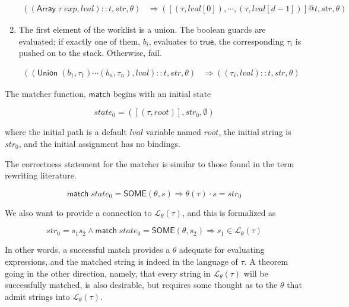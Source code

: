 \documentclass[svgnames]{llncs}
\newcommand{\konst}[1]{\ensuremath{\mathsf{#1}}}
\newcommand{\imp}{\Rightarrow}
\newcommand{\lval}{\ensuremath{\mathit{lval}}}
\newcommand{\LangTheta}[1]{\ensuremath{{\mathcal L}_{\theta}({#1})}}
\begin{document}
\begin{definition}
\begin{enumerate}
\begin{align*}
((\konst{Array}\; \tau \; \mathit{exp},\lval)::t, \mathit{str}, \theta)
   &\Rightarrow
  ([(\tau,\lval[0]), \cdots , (\tau,\lval[d-1])] @ t,\mathit{str}, \theta)
\end{align*}

\item The first element of the worklist is a union. The boolean guards
  are evaluated; if exactly one of them, $b_i$, evaluates to \konst{true}, the
  corresponding $\tau_i$ is pushed on to the stack. Otherwise, fail.

\begin{align*}
((\konst{Union}\; (b_1,\tau_1) \cdots (b_n,\tau_n), \lval)::t, \mathit{str}, \theta)
   &\Rightarrow
  ((\tau_i,\lval)::t,\mathit{str}, \theta)
\end{align*}


\end{enumerate}

\noindent The matcher function, \konst{match} begins with an initial state

\[
  \mathit{state}_0 = ([(\tau,\mathit{root})],\mathit{str}_0,\emptyset)
\]

where the initial path is a default \lval{} variable named
$\mathit{root}$, the initial string is $\mathit{str}_0$, and the
initial assignment has no bindings.

\end{definition}

The correctness statement for the matcher is similar to those found in
the term rewriting literature.

\begin{theorem}

\[
  \konst{match}\; \mathit{state}_0 = \konst{SOME}(\theta, s)
  \imp \theta(\tau) \cdot s = \mathit{str}_0
\]

\noindent We also want to provide a connection to $\LangTheta{\tau}$,
and this is formalized as

\[
  \mathit{str}_0 = s_1 s_2 \land \konst{match}\; \mathit{state}_0 =
  \konst{SOME}(\theta, s_2) \imp s_1 \in \LangTheta{\tau}
\]

In other words, a successful match provides a $\theta$ adequate for
evaluating expressions, and the matched string is indeed in the
language of $\tau$. A theorem going in the other direction, namely,
that every string in $\LangTheta{\tau}$ will be successfully
matched, is also desirable, but requires some thought as to the
$\theta$ that admit strings into $\LangTheta{\tau}$.

\end{theorem}
\end{document}
